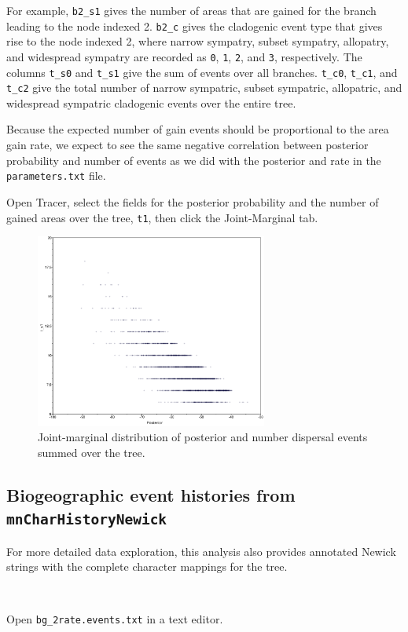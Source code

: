 \documentclass[11pt]{article}
\newcommand{\impmark}{\strut\vadjust{\domark}}
\newcommand{\domark}{%
  \vbox to 0pt{
    \kern-\dp\strutbox
    \smash{\llap{$\rightarrow$\kern1em}}
    \vss
  }%
}
\begin{document}
For example, {\tt b2\_s1} gives the number of areas that are gained for the branch leading to the node indexed 2.
{\tt b2\_c} gives the cladogenic event type that gives rise to the node indexed 2, where narrow sympatry, subset sympatry, allopatry, and widespread sympatry are recorded as {\tt 0}, {\tt 1}, {\tt 2}, and {\tt 3}, respectively. The columns {\tt t\_s0} and {\tt t\_s1} give the sum of events over all branches. {\tt t\_c0}, {\tt t\_c1}, and {\tt t\_c2} give the total number of narrow sympatric, subset sympatric, allopatric, and widespread sympatric cladogenic events over the entire tree.

Because the expected number of gain events should be proportional to the area gain rate, we expect to see the same negative correlation between posterior probability and number of events as we did with the posterior and rate in the {\tt parameters.txt} file.

Open Tracer, select the fields for the posterior probability and the number of gained areas over the tree, {\tt t1}, then click the Joint-Marginal tab.

\begin{figure}[H]
\centering
\includegraphics[width=3in]{figures/joint_ngain_posterior}
\caption{Joint-marginal distribution of posterior and number dispersal events summed over the tree.}
\end{figure}


\subsection{Biogeographic event histories from {\tt mnCharHistoryNewick}}

For more detailed data exploration, this analysis also provides annotated Newick strings with the complete character mappings for the tree.

\noindent \\ \impmark Open {\tt bg\_2rate.events.txt} in a text editor.
\end{document}

